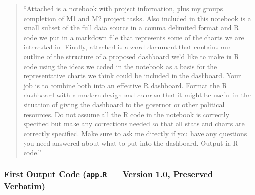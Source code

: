 \documentclass[
  letterpaper,
  DIV=11,
  numbers=noendperiod]{scrartcl}
\begin{document}
\begin{quote}
``Attached is a notebook with project information, plus my groups
completion of M1 and M2 project tasks. Also included in this notebook is
a small subset of the full data source in a comma delimited format and R
code we put in a markdown file that represents some of the charts we are
interested in. Finally, attached is a word document that contains our
outline of the structure of a proposed dashboard we'd like to make in R
code using the ideas we coded in the notebook as a basis for the
representative charts we think could be included in the dashboard. Your
job is to combine both into an effective R dashboard. Format the R
dashboard with a modern design and color so that it might be useful in
the situation of giving the dashboard to the governor or other political
resources. Do not assume all the R code in the notebook is correctly
specified but make any corrections needed so that all stats and charts
are correctly specified. Make sure to ask me directly if you have any
questions you need answered about what to put into the dashboard. Output
in R code.''
\end{quote}

\subsubsection{\texorpdfstring{First Output Code (\texttt{app.R} ---
Version 1.0, Preserved
Verbatim)}{First Output Code (app.R --- Version 1.0, Preserved Verbatim)}}\label{first-output-code-app.r-version-1.0-preserved-verbatim}
\end{document}
